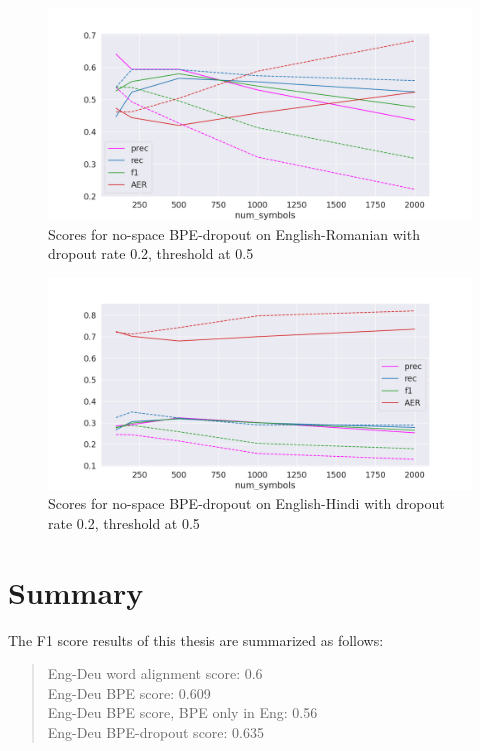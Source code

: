 \begin{figure}[!ht]
    \centering
    \includegraphics[width=13cm]{../reports/scores_dropout_bpe/no space/0.2/eng_ron_ns_0.5_thres_fastalign.png}
    \caption{Scores for no-space BPE-dropout on English-Romanian with dropout rate 0.2, threshold at 0.5}
\end{figure}

\clearpage
\begin{figure}[!ht]
    \centering
    \includegraphics[width=13cm]{../reports/scores_dropout_bpe/no space/0.2/eng_hin_ns_0.5_thres_fastalign.png}
    \caption{Scores for no-space BPE-dropout on English-Hindi with dropout rate 0.2, threshold at 0.5}
\end{figure}

\section{Summary}

The F1 score results of this thesis are summarized as follows:

\begin{quote}
    Eng-Deu word alignment score: 0.6\\
    Eng-Deu BPE score: 0.609\\
    Eng-Deu BPE score, BPE only in Eng: 0.56\\
    Eng-Deu BPE-dropout score: 0.635
\end{quote}

